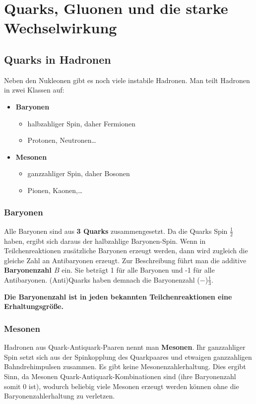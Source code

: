 \chapter{Quarks, Gluonen und die starke Wechselwirkung}

\section{Quarks in Hadronen}
Neben den Nukleonen gibt es noch viele instabile Hadronen.
Man teilt Hadronen in zwei Klassen auf:
\begin{itemize}
	\item \textbf{Baryonen} \begin{itemize}
		\item halbzahliger Spin, daher Fermionen
		\item Protonen, Neutronen\dots
	\end{itemize}
	\item \textbf{Mesonen} \begin{itemize}
		\item ganzzahliger Spin, daher Bosonen
		\item Pionen, Kaonen,\dots
	\end{itemize}
\end{itemize}

\subsection{Baryonen}
Alle Baryonen sind aus \textbf{3 Quarks} zusammengesetzt.
Da die Quarks Spin $\tfrac{1}{2}$ haben, ergibt sich daraus der halbzahlige Baryonen-Spin.
Wenn in Teilchenreaktionen zusätzliche Baryonen erzeugt werden, dann wird zugleich die gleiche Zahl an Antibaryonen erzeugt.
Zur Beschreibung führt man die additive \textbf{Baryonenzahl $B$} ein.
Sie beträgt 1 für alle Baryonen und -1 für alle Antibaryonen.
(Anti)Quarks haben demnach die Baryonenzahl ($-$)$\tfrac{1}{3}$.

\textbf{Die Baryonenzahl ist in jeden bekannten Teilchenreaktionen eine Erhaltungsgröße.}

\subsection{Mesonen}
Hadronen aus Quark-Antiquark-Paaren nennt man \textbf{Mesonen}.
Ihr ganzzahliger Spin setzt sich aus der Spinkopplung des Quarkpaares und etwaigen ganzzahligen Bahndrehimpulsen zusammen.
Es gibt keine Mesonenzahlerhaltung.
Dies ergibt Sinn, da Mesonen Quark-Antiquark-Kombinationen sind (ihre Baryonenzahl somit 0 ist), wodurch beliebig viele Mesonen erzeugt werden können ohne die Baryonenzahlerhaltung zu verletzen.

